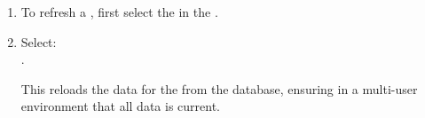 

\begin{enumerate}
\item To refresh a \gdproject{}, first select the \gdproject{} in the \gdtestsuitebrowser{}.
\item Select:\\
.

This reloads the data for the \gdproject{} from the database, ensuring in a multi-user environment that all \gdproject{} data is current.


\end{enumerate}
